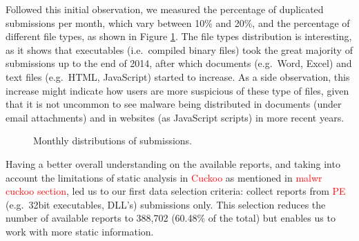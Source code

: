 Followed this initial observation, we measured the percentage of duplicated submissions per month, which vary between 10\% and 20\%, and the percentage of different file types, as shown in Figure \ref{fig:monthly_distributions}.
The file types distribution is interesting, as it shows that executables (i.e.\ compiled binary files) took the great majority of submissions up to the end of 2014, after which documents (e.g.\ Word, Excel) and text files (e.g.\ HTML, JavaScript) started to increase.
As a side observation, this increase might indicate how users are more suspicious of these type of files, given that it is not uncommon to see malware being distributed in documents (under email attachments) and in websites (as JavaScript scripts) in more recent years.

\begin{figure}[!htb]
	\begin{subfigmatrix}{2}
	\end{subfigmatrix}
	\caption[Monthly distributions of submissions.]{Monthly distributions of submissions.}
	\label{fig:monthly_distributions}
\end{figure}

Having a better overall understanding on the available reports, and taking into account the limitations of static analysis in \textcolor{red}{Cuckoo} as mentioned in \textcolor{red}{malwr cuckoo section}, led us to our first data selection criteria: collect reports from \textcolor{red}{PE} (e.g.\ 32bit executables, DLL's) submissions only.
This selection reduces the number of available reports to 388,702 (60.48\% of the total) but enables us to work with more static information.

